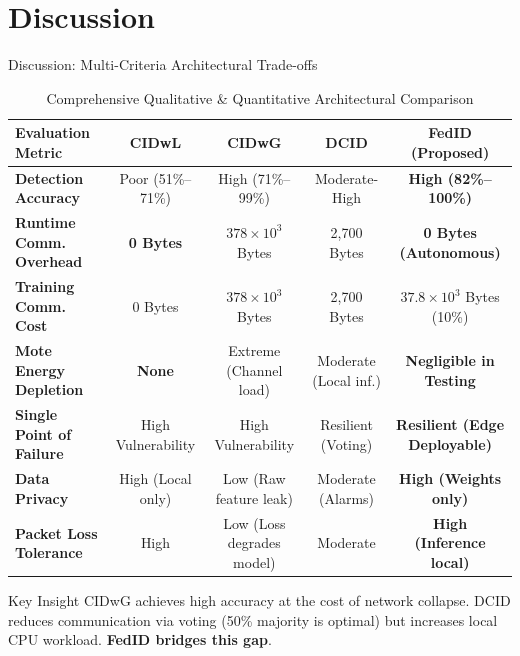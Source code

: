 \documentclass[aspectratio=169, 10pt]{beamer}
\begin{document}
\section{Discussion}
\begin{frame}{Discussion: Multi-Criteria Architectural Trade-offs}
  \begin{table}[h]
    \centering
    \scriptsize
    \caption{Comprehensive Qualitative \& Quantitative Architectural Comparison \cite{yilmaz2025exploring}}
    \begin{tabular}{lcccc}
      \toprule
      \textbf{Evaluation Metric} & \textbf{CIDwL} & \textbf{CIDwG} & \textbf{DCID} & \textbf{FedID (Proposed)} \\
      \midrule
      \textbf{Detection Accuracy} & Poor (51\%--71\%) & High (71\%--99\%) & Moderate-High & \textbf{High (82\%--100\%)} \\
      \textbf{Runtime Comm. Overhead} & \textbf{0 Bytes} & $378 \times 10^3$ Bytes & 2,700 Bytes & \textbf{0 Bytes (Autonomous)} \\
      \textbf{Training Comm. Cost} & 0 Bytes & $378 \times 10^3$ Bytes & 2,700 Bytes & $37.8 \times 10^3$ Bytes (10\%) \\
      \textbf{Mote Energy Depletion} & \textbf{None} & Extreme (Channel load) & Moderate (Local inf.) & \textbf{Negligible in Testing} \\
      \textbf{Single Point of Failure} & High Vulnerability & High Vulnerability & Resilient (Voting) & \textbf{Resilient (Edge Deployable)} \\
      \textbf{Data Privacy} & High (Local only) & Low (Raw feature leak) & Moderate (Alarms) & \textbf{High (Weights only)} \\
      \textbf{Packet Loss Tolerance} & High & Low (Loss degrades model) & Moderate & \textbf{High (Inference local)} \\
      \bottomrule
    \end{tabular}
  \end{table}
  \begin{alertblock}{Key Insight}
    CIDwG achieves high accuracy at the cost of network collapse. DCID reduces communication via voting (50\% majority is optimal) but increases local CPU workload. \textbf{FedID bridges this gap}.
  \end{alertblock}
\end{frame}

\end{document}

